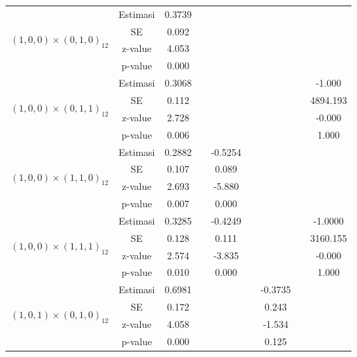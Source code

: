\begin{enumerate}[label=\alph*.]
\begin{longtable}{|c|c|c|c|c|c|c|c|c|}
            \multirow{4}{*}{$(1,0,0)\times(0,1,0)_{12}$}
            & Estimasi & 0.3739  & {} & {} & {} & {} & {} & {} \\ \cline{2-9}
            & SE       & 0.092  & {} & {} & {} & {} & {} & {}\\ \cline{2-9}
            & z-value  & 4.053   & {} & {} & {} & {} & {} & {}\\ \cline{2-9}
            & p-value  & 0.000 & {} & {} & {} & {} & {} & {}\\ \hline

            \multirow{4}{*}{$(1,0,0)\times(0,1,1)_{12}$}
            & Estimasi & 0.3068  & {} & {} & {} & {} & {} & -1.000 \\ \cline{2-9}
            & SE       & 0.112  & {} & {} & {} & {} & {} & 4894.193\\ \cline{2-9}
            & z-value  & 2.728   & {} & {} & {} & {} & {} & -0.000\\ \cline{2-9}
            & p-value  & 0.006 & {} & {} & {} & {} & {} & 1.000\\ \hline

            \multirow{4}{*}{$(1,0,0)\times(1,1,0)_{12}$}
            & Estimasi & 0.2882  & {} & -0.5254 & {} & {} & {} & {}\\ \cline{2-9}
            & SE       & 0.107  & {} & 0.089 & {} & {} & {} & {}\\ \cline{2-9}
            & z-value  & 2.693   & {} & -5.880 & {} & {} & {}& {}\\ \cline{2-9}
            & p-value  & 0.007 & {} & 0.000 & {} & {} & {} & {}\\ \hline

            \multirow{4}{*}{$(1,0,0)\times(1,1,1)_{12}$}
            & Estimasi & 0.3285  & {} & -0.4249 & {} & {} & {} & -1.0000 \\ \cline{2-9}
            & SE       & 0.128    & {} & 0.111 & {} & {} & {} & 3160.155\\ \cline{2-9}
            & z-value  & 2.574   & {} & -3.835 & {} & {} & {} & -0.000\\ \cline{2-9}
            & p-value  & 0.010    & {} &  0.000 & {} & {} & {} & 1.000\\ \hline

            \multirow{4}{*}{$(1,0,1)\times(0,1,0)_{12}$}
            & Estimasi & 0.6981  & {} & {} & {} & -0.3735 & {} & {}\\ \cline{2-9}
            & SE       & 0.172 & {} & {} & {} & 0.243 & {} & {}\\ \cline{2-9}
            & z-value  & 4.058   & {} & {} & {} & -1.534 & {}& {}\\ \cline{2-9}
            & p-value  & 0.000 & {} & {} & {} & 0.125 & {} & {}\\ \hline


\end{longtable}
\end{enumerate}
